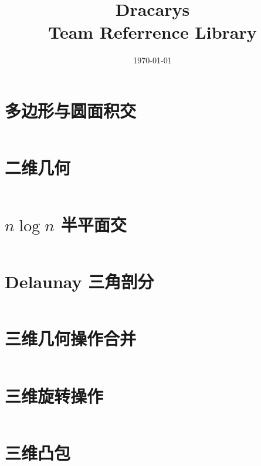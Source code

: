 \documentclass[titlepage,landscape,a4paper,10pt]{article}
\title{\LARGE{Dracarys} \\[2ex] \Large{Team Referrence Library} }
\date{\today}
\begin{document}
\maketitle

\begin{multicols*}{2}

\begin{spacing}{0}
	\tableofcontents
\end{spacing}
\end{multicols*}

\begin{multicols}{2}

\newpage


\begin{spacing}{0.8}

\section{多边形与圆面积交}
\inputminted{cpp}{src/多边形与圆面积交.cpp}

\section{二维几何}
\inputminted{cpp}{merge/Geo2D.cpp}

\section{$n\log n$ 半平面交}
\inputminted{cpp}{src/nlogn半平面交.cpp}

\section{Delaunay 三角剖分}
\inputminted{cpp}{improve/DelaunayTriangulation.cpp}


\section{三维几何操作合并}
\inputminted{cpp}{src/三维几何操作合并.cpp}

\section{三维旋转操作}
\inputminted{cpp}{src/三维旋转操作.cpp}

\section{三维凸包}
\inputminted{cpp}{src/三维凸包.cpp}


\end{spacing}
\end{multicols}
\end{document}
